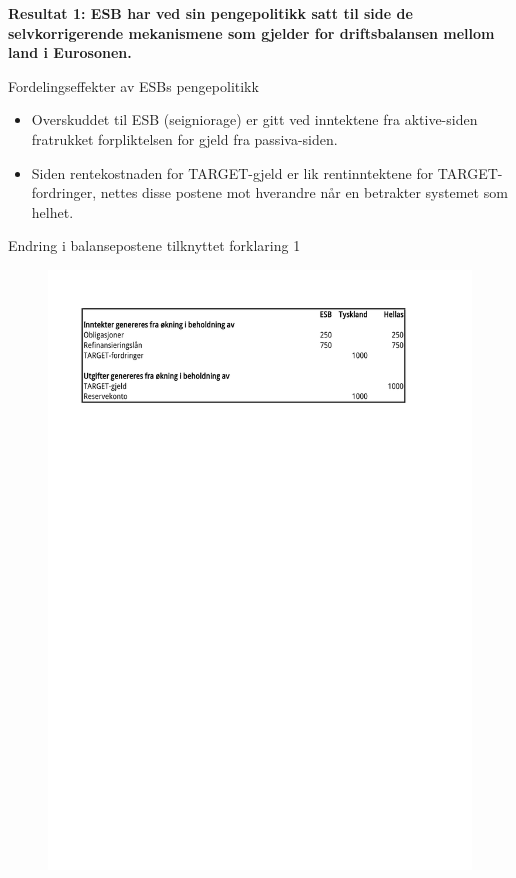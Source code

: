 \documentclass[notes=show notes]{beamer}
\begin{document}
\begin{frame}
	\textbf{Resultat 1: ESB har ved sin pengepolitikk satt til side de selvkorrigerende mekanismene som gjelder for driftsbalansen mellom land i Eurosonen.}
\end{frame}
\begin{frame}{Fordelingseffekter av ESBs pengepolitikk}
\begin{itemize}
	\item Overskuddet til ESB (seigniorage) er gitt ved inntektene fra aktive-siden fratrukket forpliktelsen for gjeld fra passiva-siden.
	\item Siden rentekostnaden for TARGET-gjeld er lik rentinntektene for TARGET-fordringer, nettes disse postene mot hverandre n\aa r en betrakter systemet som helhet.
\end{itemize}
\end{frame}
\begin{frame}{Endring i balansepostene tilknyttet forklaring 1}
\begin{figure}
\centering
\includegraphics[width=0.9\linewidth]{SenFork1-1}
\caption{}
\label{fig:SenFork1-1}
\end{figure}
\end{frame}
\end{document}
